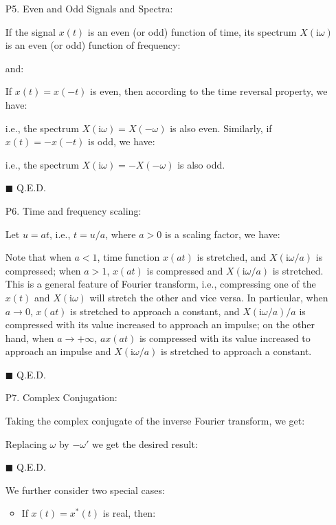 \begin{itemize}
	\item[P5.] Even and Odd Signals and Spectra:
	
	If the signal $x(t)$ is an even (or odd) function of time, its spectrum $X(\mathrm{i}\omega)$ is an even (or odd) function of frequency:
	
	and:
	
	\begin{dem} If $x(t)=x(-t)$ is even, then according to the time reversal property, we have:
	
	i.e., the spectrum $X(\mathrm{i}\omega)=X(-\omega)$ is also even. Similarly, if $x(t)=-x(-t)$ is odd, we have:
	
	i.e., the spectrum $X(\mathrm{i}\omega)=-X(-\omega)$ is also odd.
	\begin{flushright}
		$\blacksquare$  Q.E.D.
	\end{flushright}
	\end{dem}
	
	\item[P6.] Time and frequency scaling:
	
	\begin{dem}
	Let $u=at$, i.e., $t=u/a$, where $a>0$ is a scaling factor, we have:
	
	Note that when $a<1$, time function $x(at)$ is stretched, and $X(\mathrm{i}\omega/a)$ is compressed; when $a>1$, $x(at)$ is compressed and $X(\mathrm{i}\omega/a)$ is stretched.	This is a general feature of Fourier transform, i.e., compressing one of the $x(t)$ and $X(\mathrm{i}\omega)$ will stretch the other and vice versa. In particular, when $a\rightarrow 0$, $x(at)$ is stretched to approach a constant, and $X(\mathrm{i}\omega/a)/a$ is compressed with its value increased to approach an impulse; on the other	hand, when $a \rightarrow +\infty$, $ax(at)$ is compressed with its value increased to approach an impulse and $X(\mathrm{i}\omega/a)$ is stretched to approach a constant.
	\begin{flushright}
		$\blacksquare$  Q.E.D.
	\end{flushright}
	\end{dem}
	
	\item[P7.] Complex Conjugation:
	
	
	\begin{dem} Taking the complex conjugate of the inverse Fourier transform, we get:
	
	Replacing $\omega$ by $-\omega'$ we get the desired result:
	
	\begin{flushright}
		$\blacksquare$  Q.E.D.
	\end{flushright}
	\end{dem}
	We further consider two special cases:
	\begin{itemize}
	\item If $x(t)=x^*(t)$ is real, then:
	

\end{itemize}
\end{itemize}
